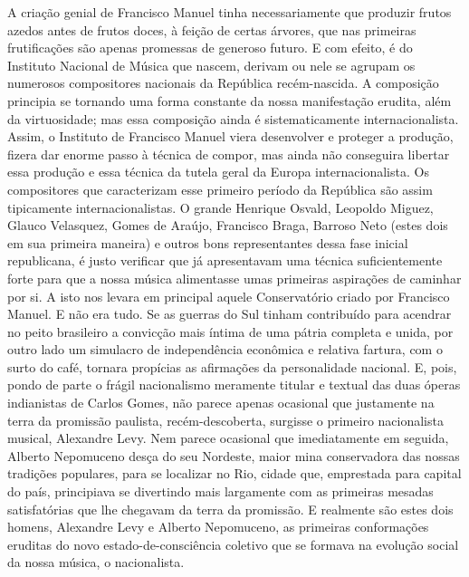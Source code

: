 A criação genial de Francisco Manuel tinha necessariamente que produzir
frutos azedos antes de frutos doces, à feição de certas árvores, que nas
primeiras frutificações são apenas promessas de generoso futuro. E com
efeito, é do Instituto Nacional de Música que nascem, derivam ou nele se
agrupam os numerosos compositores nacionais da República recém-nascida.
A composição principia se tornando uma forma constante da nossa
manifestação erudita, além da virtuosidade; mas essa composição ainda é
sistematicamente internacionalista. Assim, o Instituto de Francisco
Manuel viera desenvolver e proteger a produção, fizera dar enorme passo
à técnica de compor, mas ainda não conseguira libertar essa produção e
essa técnica da tutela geral da Europa internacionalista. Os
compositores que caracterizam esse primeiro período da República são
assim tipicamente internacionalistas. O grande Henrique Osvald, Leopoldo
Miguez, Glauco Velasquez, Gomes de Araújo, Francisco Braga, Barroso Neto
(estes dois em sua primeira maneira) e outros bons representantes dessa
fase inicial republicana, é justo verificar que já apresentavam uma
técnica suficientemente forte para que a nossa música alimentasse umas
primeiras aspirações de caminhar por si. A isto nos levara em principal
aquele Conservatório criado por Francisco Manuel. E não era tudo. Se as
guerras do Sul tinham contribuído para acendrar no peito brasileiro a
convicção mais íntima de uma pátria completa e unida, por outro lado um
simulacro de independência econômica e relativa fartura, com o surto do
café, tornara propícias as afirmações da personalidade nacional. E,
pois, pondo de parte o frágil nacionalismo meramente titular e textual
das duas óperas indianistas de Carlos Gomes, não parece apenas ocasional
que justamente na terra da promissão paulista, recém-descoberta,
surgisse o primeiro nacionalista musical, Alexandre Levy. Nem parece
ocasional que imediatamente em seguida, Alberto Nepomuceno desça do seu
Nordeste, maior mina conservadora das nossas tradições populares, para
se localizar no Rio, cidade que, emprestada para capital do país,
principiava se divertindo mais largamente com as primeiras mesadas
satisfatórias que lhe chegavam da terra da promissão. E realmente são
estes dois homens, Alexandre Levy e Alberto Nepomuceno, as primeiras
conformações eruditas do novo estado-de-consciência coletivo que se
formava na evolução social da nossa música, o nacionalista.


